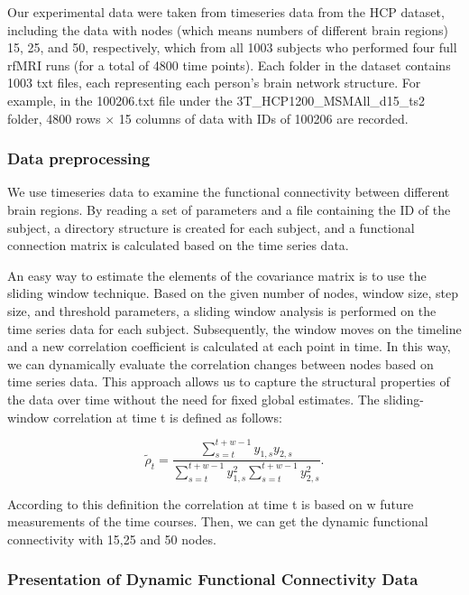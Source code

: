 \documentclass[11pt]{article}
\begin{document}
Our experimental data were taken from timeseries data from the HCP dataset,  including the data with nodes (which means numbers of different brain regions) 15, 25, and 50, respectively, which from all 1003 subjects who performed four full rfMRI runs (for a total of 4800 time points). Each folder in the dataset contains 1003 txt files, each representing each person's brain network structure. For example, in the 100206.txt file under the 3T\_HCP1200\_MSMAll\_d15\_ts2 folder, 4800 rows $\times$ 15 columns of data with IDs of 100206 are recorded.

\subsubsection{Data preprocessing\cite{Filippini2009-so}\cite{Beckmann2004-jg}\cite{Smith2011-ki}\cite{Smith2013-gg}\cite{Allen2014-tl}}

We use timeseries data to examine the functional connectivity between different brain regions. By reading a set of parameters and a file containing the ID of the subject, a directory structure is created for each subject, and a functional connection matrix is calculated based on the time series data.

An easy way to estimate the elements of the covariance matrix is to use the sliding window technique. Based on the given number of nodes, window size, step size, and threshold parameters, a sliding window analysis is performed on the time series data for each subject. Subsequently, the window moves on the timeline and a new correlation coefficient is calculated at each point in time. In this way, we can dynamically evaluate the correlation changes between nodes based on time series data. This approach allows us to capture the structural properties of the data over time without the need for fixed global estimates. The sliding-window correlation at time t is defined as follows:

$$
    \tilde\rho_t = \frac{\sum_{s=t}^{t+w-1} y_{1, s} y_{2, s}}{\sum_{s=t}^{t+w-1} y_{1, s}^2 \sum_{s=t}^{t+w-1} y_{2, s}^2}.
$$

According to this definition the correlation at time t is based on w future measurements of the time courses. Then, we can get the dynamic functional connectivity with 15,25 and 50 nodes.

\subsubsection{Presentation of Dynamic Functional Connectivity Data}
\end{document}
